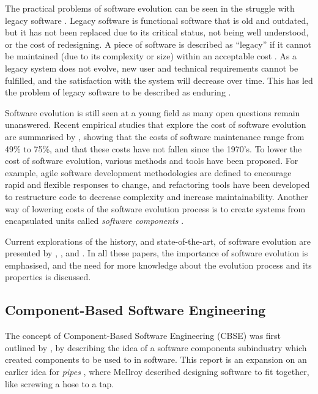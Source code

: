 The practical problems of software evolution can be seen in the struggle with legacy software \citep{Bennett1995}.
Legacy software is functional software that is old and outdated, but it has not been replaced due to its critical status, not being well understood, or the cost of redesigning.
A piece of software is described as ``legacy'' if it cannot be maintained  (due to its complexity or size) within an acceptable cost \citep{Bisbal1999}.
As a legacy system does not evolve, new user and technical requirements cannot be fulfilled, and the satisfaction with the system will decrease over time.
This has led the problem of legacy software to be described as enduring \citep{Bennett2000}. 

Software evolution is still seen at a young field \citep{Godfrey2008} as many open questions remain unanswered.
Recent empirical studies that explore the cost of software evolution are summarised by \cite{Grubb2003}, 
showing that the costs of software maintenance range from 49\% to 75\%, and that these costs have not fallen since the 1970's. 
To lower the cost of software evolution, various methods and tools have been proposed.
For example, agile software development methodologies \citep{beck2001manifesto} are defined to encourage rapid and flexible responses to change,
and refactoring tools \citep{fowler1999refactoring} have been developed to restructure code to decrease complexity and increase maintainability. 
Another way of lowering costs of the software evolution process is to create systems from encapsulated units called \textit{software components} \citep{Szyperski2002}.

Current explorations of the history, and state-of-the-art, of software evolution are presented by \cite{Bennett2000}, \cite{Lehman2003}, and \cite{Godfrey2008}.
In all these papers, the importance of software evolution is emphasised, and the need for more knowledge about the evolution process and its properties is discussed.

\subsection{Component-Based Software Engineering}
\label{back.CBSE}
The concept of Component-Based Software Engineering (CBSE) was first outlined by \cite{McIlroy1969}, 
by describing the idea of a software components subindustry which created components to be used to in software.
This report is an expansion on an earlier idea for \textit{pipes} \citep{mcilroy1964pipes}, 
where McIlroy described designing software to fit together, like screwing a hose to a tap.

